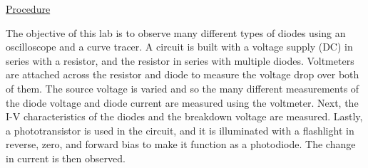 \underline{Procedure}

The objective of this lab is to observe many different types of diodes using an oscilloscope and a curve tracer. A circuit is built with a voltage supply (DC) in series with a resistor, and the resistor in series with multiple diodes. Voltmeters are attached across the resistor and diode to measure the voltage drop over both of them. The source voltage is varied and so the many different measurements of the diode voltage and diode current are measured using the voltmeter. Next, the I-V characteristics of the diodes and the breakdown voltage are measured. Lastly, a phototransistor is used in the circuit, and it is illuminated with a flashlight in reverse, zero, and forward bias to make it function as a photodiode. The change in current is then observed. \\

